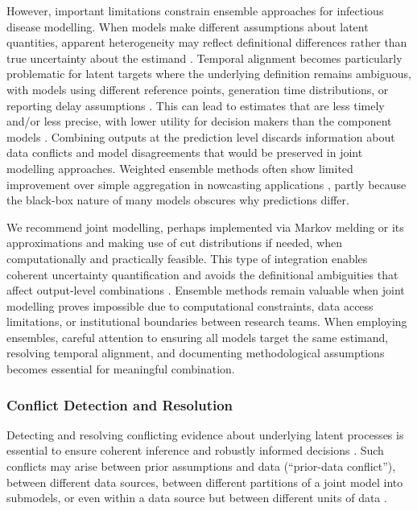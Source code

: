 \documentclass{article}
\begin{document}
However, important limitations constrain ensemble approaches for infectious disease modelling.
When models make different assumptions about latent quantities, apparent heterogeneity may reflect definitional differences rather than true uncertainty about the estimand \citep{brockhaus2023why}.
Temporal alignment becomes particularly problematic for latent targets where the underlying definition remains ambiguous, with models using different reference points, generation time distributions, or reporting delay assumptions \citep{brockhaus2023why}.
This can lead to estimates that are less timely and/or less precise, with lower utility for decision makers than the component models \citep{manley2024combining}.
Combining outputs at the prediction level discards information about data conflicts and model disagreements that would be preserved in joint modelling approaches.
Weighted ensemble methods often show limited improvement over simple aggregation in nowcasting applications \citep{sherratt2021exploring}, partly because the black-box nature of many models obscures why predictions differ.

We recommend joint modelling, perhaps implemented via Markov melding or its approximations and making use of cut distributions if needed, when computationally and practically feasible. This type of integration enables coherent uncertainty quantification and avoids the definitional ambiguities that affect output-level combinations \citep{brockhaus2023why}.
Ensemble methods remain valuable when joint modelling proves impossible due to computational constraints, data access limitations, or institutional boundaries between research teams.
When employing ensembles, careful attention to ensuring all models target the same estimand, resolving temporal alignment, and documenting methodological assumptions becomes essential for meaningful combination.


\subsubsection{Conflict Detection and Resolution}

Detecting and resolving conflicting evidence about underlying latent processes is essential to ensure coherent inference and robustly informed decisions \citep{presanis2013conflict,sherratt2021exploring}. Such conflicts may arise between prior assumptions and data (``prior-data conflict''), between different data sources, between different partitions of a joint model into submodels, or even within a data source but between different units of data \citep{presanis2013conflict,yang2025detecting}.
\end{document}
